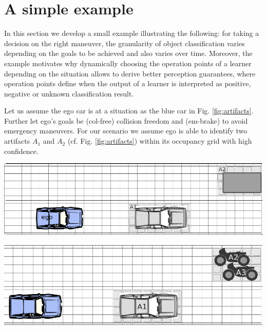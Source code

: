 \section{A simple example}\label{sec:example}
In this section we develop a small  example illustrating the following: for taking a decision on the right maneuver, the granularity of object classification varies depending on the goals to be achieved and also varies over time. Moreover, the example motivates why dynamically choosing the operation points of a learner depending on the situation allows to derive better perception guarantees, where operation points define when the output of a learner is interpreted as positive, negative or unknown classification result. 

Let us assume the ego car is at a situation as the blue car in Fig. \ref{fig:artifacts}.  
Further let ego's goals be (col-free) collision freedom and (em-brake) to avoid emergency maneuvers.
%
For our scenario we assume %
ego is able to identify two artifacts $A_1$ and $A_2$ (cf. Fig. \ref{fig:artifacts}) within its occupancy grid with high confidence. \\[2mm] 
%
\begin{minipage}{\textwidth}
	\begin{minipage}{0.45\textwidth}
	\centering
	\includegraphics[width=.8\textwidth]{ego+artifacts.eps}
	\label{fig:artifacts}
\end{minipage}\hfill	
\begin{minipage}{0.45\textwidth}
	\centering
	\includegraphics[width=.8\textwidth]{ego+motorbike.eps}
	\label{fig:mbike}
\end{minipage}
\vspace*{1mm}
\end{minipage}


